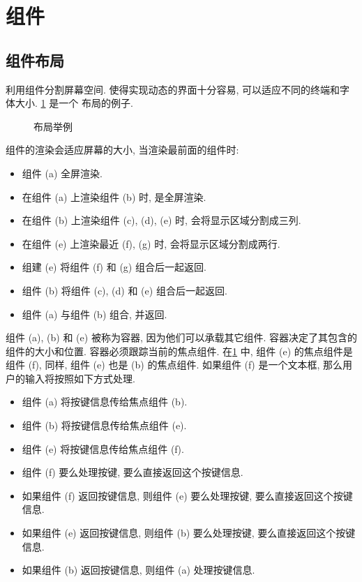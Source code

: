 \section{组件}
\subsection{组件布局}
\indent\urwid{} 利用组件分割屏幕空间. 使得实现动态的界面十分容易, 可以适应不同的终端和字体大小. \cref{fig:example_of_widget_layout} 是一个 \urwid{} 布局的例子.%
%
\begin{figure}[!htb]
    \centering
    
    \caption{\urwid{} 布局举例}
    \label{fig:example_of_widget_layout}
\end{figure}%
%
组件的渲染会适应屏幕的大小, 当渲染最前面的组件时:%
%
\begin{itemize}
  \item 组件 (a) 全屏渲染.
  \item 在组件 (a) 上渲染组件 (b) 时, 是全屏渲染.
  \item 在组件 (b) 上渲染组件 (c), (d), (e) 时, 会将显示区域分割成三列.
  \item 在组件 (e) 上渲染最近 (f), (g) 时, 会将显示区域分割成两行.
  \item 组建 (e) 将组件 (f) 和 (g) 组合后一起返回.
  \item 组件 (b) 将组件 (c), (d) 和 (e) 组合后一起返回.
  \item 组件 (a) 与组件 (b) 组合, 并返回.
\end{itemize}%
%
组件 (a), (b) 和 (e) 被称为容器, 因为他们可以承载其它组件. 容器决定了其包含的组件的大小和位置. 容器必须跟踪当前的焦点组件. 在\cref{fig:example_of_widget_layout} 
中, 组件 (e) 的焦点组件是组件 (f), 同样, 组件 (e) 也是 (b) 的焦点组件. 如果组件 (f) 是一个文本框, 那么用户的输入将按照如下方式处理.%
%
\begin{itemize}
  \item 组件 (a) 将按键信息传给焦点组件 (b).
  \item 组件 (b) 将按键信息传给焦点组件 (e).
  \item 组件 (e) 将按键信息传给焦点组件 (f).
  \item 组件 (f) 要么处理按键, 要么直接返回这个按键信息.
  \item 如果组件 (f) 返回按键信息, 则组件 (e) 要么处理按键, 要么直接返回这个按键信息.
  \item 如果组件 (e) 返回按键信息, 则组件 (b) 要么处理按键, 要么直接返回这个按键信息.
  \item 如果组件 (b) 返回按键信息, 则组件 (a) 处理按键信息.
\end{itemize}

